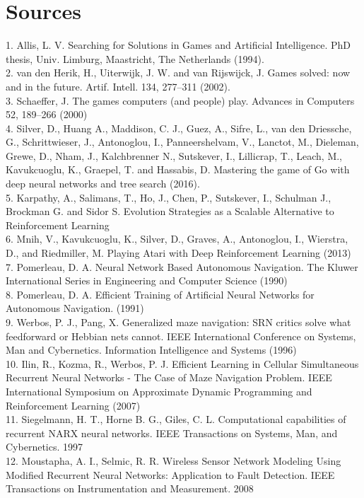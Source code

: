 \documentclass[journal]{IEEEtran}
\begin{document}
\section{Sources}
1. Allis, L. V. Searching for Solutions in Games and Artificial Intelligence. PhD thesis, Univ. Limburg, Maastricht, The Netherlands (1994).\\
2. van den Herik, H., Uiterwijk, J. W. and van Rijswijck, J. Games solved: now and in the future. Artif. Intell. 134, 277–311 (2002).\\
3. Schaeffer, J. The games computers (and people) play. Advances in Computers
52, 189–266 (2000)\\
4. Silver, D., Huang A., Maddison, C. J., Guez, A., Sifre, L., van den Driessche, G., Schrittwieser, J., Antonoglou, I., Panneershelvam, V., Lanctot, M., Dieleman, Grewe, D., Nham, J., Kalchbrenner N., Sutskever, I., Lillicrap, T., Leach, M., Kavukcuoglu, K., 
Graepel, T. and Hassabis, D. Mastering the game of Go with deep neural networks and tree search (2016). \\
5. Karpathy, A., Salimans, T., Ho, J., Chen, P., Sutskever, I., Schulman J., Brockman G. and Sidor S. Evolution Strategies as a Scalable Alternative to Reinforcement Learning\\
6. Mnih, V., Kavukcuoglu, K., Silver, D., Graves, A., Antonoglou, I., Wierstra, D., and Riedmiller, M. Playing Atari with Deep Reinforcement Learning (2013)\\
7. Pomerleau, D. A. Neural Network Based Autonomous Navigation. The Kluwer International Series in Engineering and Computer Science (1990)\\
8. Pomerleau, D. A. Efficient Training of Artificial Neural Networks for Autonomous Navigation. (1991)\\
9. Werbos, P. J., Pang, X. Generalized maze navigation: SRN critics solve what feedforward or Hebbian nets cannot. IEEE International Conference on Systems, Man and Cybernetics. Information Intelligence and Systems (1996)\\
10. Ilin, R., Kozma, R., Werbos, P. J. Efficient Learning in Cellular Simultaneous Recurrent Neural Networks - The Case of Maze Navigation Problem. IEEE International Symposium on Approximate Dynamic Programming and Reinforcement Learning (2007)\\
11. Siegelmann, H. T., Horne B. G., Giles, C. L. Computational capabilities of recurrent NARX neural networks. IEEE Transactions on Systems, Man, and Cybernetics. 1997\\
12. Moustapha, A. I., Selmic, R. R. Wireless Sensor Network Modeling Using Modified Recurrent Neural Networks: Application to Fault Detection. IEEE Transactions on Instrumentation and Measurement. 2008\\
\end{document}
